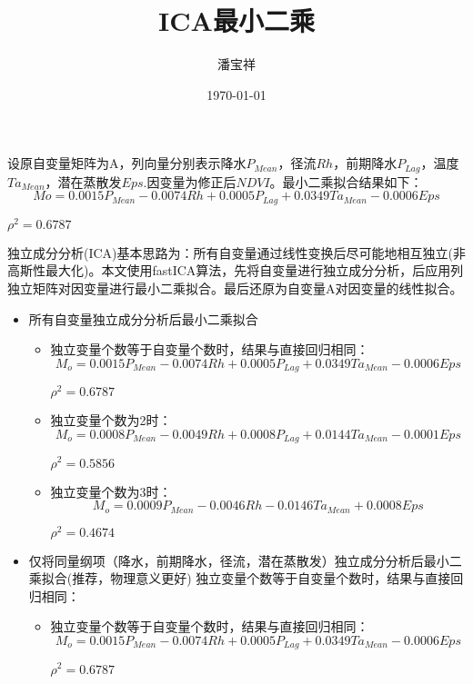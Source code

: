 \documentclass{article}
\begin{document}
\begin{CJK}{UTF8}{gkai}
\title{ICA最小二乘}
\date{\today}
\author{潘宝祥}
\maketitle
  设原自变量矩阵为A，列向量分别表示降水$P_{Mean}$，径流$Rh$，前期降水$P_{Lag}$，温度$Ta_{Mean}$，潜在蒸散发$Eps$.因变量为修正后$NDVI$。最小二乘拟合结果如下：
\begin{equation*}
Mo=0.0015P_{Mean}-0.0074Rh+0.0005P_{Lag}+0.0349Ta_{Mean}-0.0006Eps
\end{equation*}
\begin{center}
$\rho^2=0.6787$ 
\end{center}

独立成分分析(ICA)基本思路为：所有自变量通过线性变换后尽可能地相互独立(非高斯性最大化)。本文使用fastICA算法，先将自变量进行独立成分分析，后应用列独立矩阵对因变量进行最小二乘拟合。最后还原为自变量A对因变量的线性拟合。
\begin{itemize}

\item 所有自变量独立成分分析后最小二乘拟合
\begin{itemize}
\item 独立变量个数等于自变量个数时，结果与直接回归相同：
\begin{equation*}
M_o=0.0015P_{Mean}-0.0074Rh+0.0005P_{Lag}+0.0349Ta_{Mean}-0.0006Eps
\end{equation*}
\begin{center}
$\rho^2=0.6787$ 
\end{center}

\item 独立变量个数为2时：
\begin{equation*}
M_o=0.0008P_{Mean}-0.0049Rh+0.0008P_{Lag}+0.0144Ta_{Mean}-0.0001Eps
\end{equation*}
\begin{center}
$\rho^2=0.5856$
\end{center}

\item 独立变量个数为3时：
\begin{equation*}
M_o=0.0009P_{Mean}-0.0046Rh -0.0146Ta_{Mean}+0.0008Eps
\end{equation*}
\begin{center}
$\rho^2=0.4674$
\end{center}
\end{itemize}


\item 仅将同量纲项（降水，前期降水，径流，潜在蒸散发）独立成分分析后最小二乘拟合(推荐，物理意义更好)
独立变量个数等于自变量个数时，结果与直接回归相同：
\begin{itemize}
\item 独立变量个数等于自变量个数时，结果与直接回归相同：
\begin{equation*}
M_o=0.0015P_{Mean}-0.0074Rh+0.0005P_{Lag}+0.0349Ta_{Mean}-0.0006Eps
\end{equation*}
\begin{center}
$\rho^2=0.6787$ 
\end{center}


\end{itemize}
\end{itemize}
\end{CJK}
\end{document}
